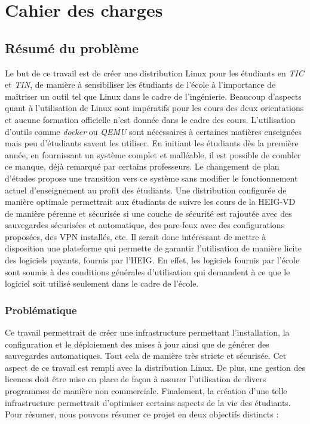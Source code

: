 \chapter{Cahier des charges}



\section*{Résumé du problème}
Le but de ce travail est de créer une distribution Linux pour les étudiants en \textit{TIC} et \textit{TIN}, de manière à sensibiliser les étudiants de l'école à  l'importance de maîtriser un outil tel que Linux dans le cadre de l'ingénierie.
Beaucoup d'aspects quant à l'utilisation de Linux sont impératifs pour les cours des deux orientations et aucune formation officielle n'est donnée dans le cadre des cours. 
L'utilisation d'outils comme \textit{docker} ou \textit{QEMU} sont nécessaires à certaines matières enseignées mais peu d'étudiants savent les utiliser. 
En initiant les étudiants dès la première année, en fournissant un système complet et malléable, il est possible de combler ce manque, déjà remarqué par certains professeurs.
Le changement de plan d'études propose une transition vers ce système sans modifier le fonctionnement actuel d'enseignement  au profit des étudiants.
\newline 
Une distribution configurée de manière optimale permettrait aux étudiants de suivre les cours de la HEIG-VD de manière pérenne et sécurisée si une couche de sécurité est rajoutée avec des sauvegardes sécurisées et automatique, des pare-feux avec des configurations proposées, des VPN installés, etc. 
\newline
Il serait donc intéressant de mettre à disposition une plateforme qui permette de garantir l'utilisation de manière licite des logiciels payants, fournis par l'HEIG.
En effet, les logiciels fournis par l'école sont soumis à des conditions générales d'utilisation qui demandent à ce que le logiciel soit utilisé seulement dans le cadre de l'école.

\subsection*{Problématique}
Ce travail permettrait de créer une infrastructure permettant l'installation, la configuration et le déploiement des mises à jour ainsi que de générer des sauvegardes automatiques. 
Tout cela de manière très stricte et sécurisée.
Cet aspect de ce travail est rempli avec la distribution Linux.
\newline 
De plus, une gestion des licences doit être mise en place de façon à assurer l'utilisation de divers programmes de manière non commerciale. 
\newline 
Finalement, la création d'une telle infrastructure permettrait d'optimiser certains aspects de la vie des étudiants.
\newline Pour résumer, nous pouvons résumer ce projet en deux objectifs distincts : 

